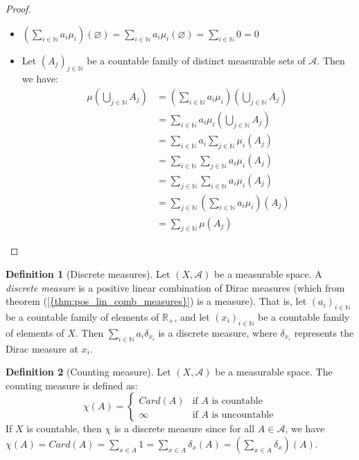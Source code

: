 \documentclass{article}
\theoremstyle{definition}
\newtheorem{definition}{Definition}[section]
\theoremstyle{remark}
\theoremstyle{example}
\newcommand{\tif}{\text{if }}
\begin{document}
\begin{proof}~
    \begin{itemize}
        \item $\left(\sum_{i \in \mathbb{N}} a_i \mu_i\right)(\varnothing) = \sum_{i \in \mathbb{N}} a_i \mu_i(\varnothing) = \sum_{i \in \mathbb{N}} 0 = 0$
        \item Let $(A_j)_{j \in \mathbb{N}}$ be a countable family of distinct measurable sets of $\mathcal{A}$. Then we have:
        \begin{align*}
            \mu(\bigcup_{j \in \mathbb{N}} A_j) &= \left(\sum_{i \in \mathbb{N}} a_i \mu_i\right)(\bigcup_{j \in \mathbb{N}} A_j)\\
            &= \sum_{i \in \mathbb{N}} a_i \mu_i(\bigcup_{j \in \mathbb{N}} A_j)\\
            &= \sum_{i \in \mathbb{N}} a_i \sum_{j \in \mathbb{N}} \mu_i(A_j)\\
            &= \sum_{i \in \mathbb{N}} \sum_{j \in \mathbb{N}} a_i \mu_i(A_j)\\
            &= \sum_{j \in \mathbb{N}} \sum_{i \in \mathbb{N}} a_i \mu_i(A_j)\\
            &= \sum_{j \in \mathbb{N}} \left(\sum_{i \in \mathbb{N}} a_i \mu_i\right)(A_j)\\
            &= \sum_{j \in \mathbb{N}} \mu(A_j)
        \end{align*}
    \end{itemize}
\end{proof}

\begin{definition}[Discrete measures]
    Let $(X, \mathcal{A})$ be a measurable space. A \textit{discrete measure} is a positive linear combination of Dirac measures (which from theorem (\ref{{thm:pos_lin_comb_measures}}) is a measure). That is, let $(a_i)_{i \in \mathbb{N}}$ be a countable family of elements of $\mathbb{R}_+$, and let $(x_i)_{i \in \mathbb{N}}$ be a countable family of elements of $X$. Then $\sum_{i \in \mathbb{N}} a_i \delta_{x_i}$ is a discrete measure, where $\delta_{x_i}$ represents the Dirac measure at $x_i$.
\end{definition}

\begin{definition}[Counting measure]
    Let $(X, \mathcal{A})$ be a measurable space. The counting measure is defined as:
        $$\chi(A) = \begin{cases} Card(A) & \tif A \text{ is countable}\\ \infty & \tif A \text{ is uncountable}\end{cases}$$
    If $X$ is countable, then $\chi$ is a discrete measure since for all $A \in \mathcal{A}$, we have $\chi(A) = Card(A) = \sum_{x \in A} 1 = \sum_{x \in A} \delta_x(A) = \left(\sum_{x \in A} \delta_x\right)(A)$.
\end{definition}
\end{document}
